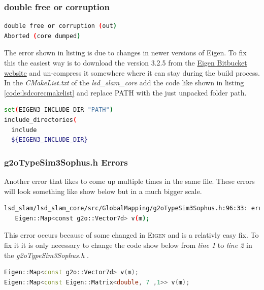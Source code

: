 \subsubsection{double free or corruption}
\begin{lstlisting}[language=bash]
double free or corruption (out)
Aborted (core dumped)
\end{lstlisting}
The error shown in listing is due to changes in newer versions of Eigen. To fix this the easiest way is to download the version \textsc{3.2.5} from the \href{https://bitbucket.org/eigen/eigen/downloads/?tab=tags}{Eigen Bitbucket website} \cite{eigenbitbucket} and un-compress it somewhere where it can stay during the build process.
In the \textit{CMakeList.txt} of the \textit{lsd\_slam\_core} add the code like shown in listing \ref{code:lsdcorecmakelist} and replace \textsc{PATH} with the just unpacked folder path.\newline
\begin{lstlisting}[language=bash, label={code:lsdcorecmakelist}, caption={CMakeList in lsd\_slam\_core with fix for Eigen}]
set(EIGEN3_INCLUDE_DIR "PATH")
include_directories(
  include
  ${EIGEN3_INCLUDE_DIR}
\end{lstlisting}

\subsubsection{g2oTypeSim3Sophus.h Errors}
Another error that likes to come up multiple times in the same file. 
These errors will look something like show below but in a much bigger scale.\newline
\begin{lstlisting}[language=bash]
lsd_slam/lsd_slam_core/src/GlobalMapping/g2oTypeSim3Sophus.h:96:33: error: template argument 1 is invalid
   Eigen::Map<const g2o::Vector7d> v(m);
\end{lstlisting}
This error occurs because of some changed in \textsc{Eigen} and is a relativly easy fix.
To fix it it is only necessary to change the code show below from \textit{line 1} to \textit{line 2} in the \textit{g2oTypeSim3Sophus.h} \cite{g2oTypeSim3Sophus.hfix}.\newline
\begin{lstlisting}[language=C++, caption={Fix for g2oTypeSim3Sophus.h}]
Eigen::Map<const g2o::Vector7d> v(m);
Eigen::Map<const Eigen::Matrix<double, 7 ,1>> v(m);
\end{lstlisting}


